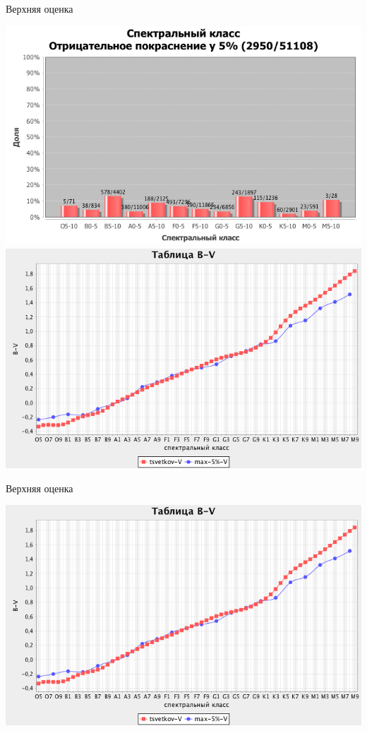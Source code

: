 \documentclass[14pt, fleqn, xcolor={dvipsnames, table}]{beamer}
\begin{document}
\begin{frame}{Верхняя оценка}
\begin{center}
            \end{center}
            \begin{center}
                \includegraphics[scale=0.24]{outlier-max5.png}
			    \includegraphics[scale=0.24]{table-max5.png}
                                
            \end{center}
        \end{frame} 
        
        \begin{frame}{Верхняя оценка}
            \begin{center}
			    \includegraphics[scale=0.49]{table-max5.png}
            \end{center}
        \end{frame} 
        
\end{document}
